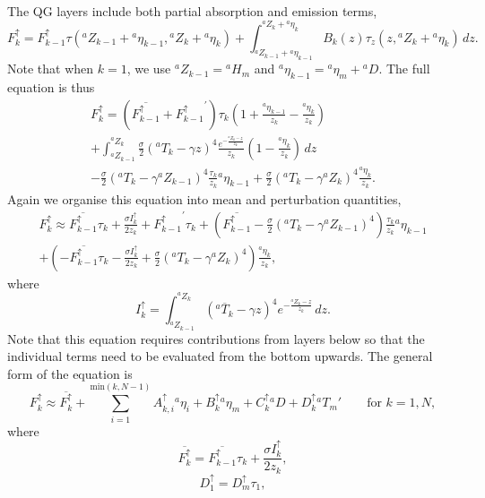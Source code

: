 \documentclass[11pt, a4paper,twoside]{article}
\newcommand{\etb}[2]{{{}^{#1}\eta_{#2}}}
\newcommand{\HH}[2]{{{}^{#1}H_{#2}}}
\newcommand{\Z}[2]{{{}^{#1}Z_{#2}}}
\newcommand{\T}[2]{{{}^{#1}T_{#2}}}
\newcommand{\aup}[1]{A^{\uparrow}_{#1}}
\newcommand{\bup}[1]{B^{\uparrow}_{#1}}
\newcommand{\cupp}[1]{C^{\uparrow}_{#1}}
\newcommand{\dup}[1]{D^{\uparrow}_{#1}}
\newcommand{\iup}[1]{I^{\uparrow}_{#1}}
\newcommand{\Fup}[1]{{F^{\uparrow}_{#1}}}
\newcommand{\B}[1]{{B_{#1}}}
\newcommand{\D}[1]{{}^{#1}D}
\numberwithin{equation}{section}
\begin{document}
\begin{description}
The QG layers include both partial absorption and emission terms,
\begin{equation}\label{eq:fluxn}
\Fup{k} = \Fup{k-1} \tau(\Z{a}{k-1}+\etb{a}{k-1},\Z{a}{k}+\etb{a}{k}) + \int_{\Z{a}{k-1}+\etb{a}{k-1}}^{\Z{a}{k}+\etb{a}{k}} \B{k}(z) {\tau_z(z,\Z{a}{k}+\etb{a}{k})} \, dz.
\end{equation}
Note that when $k=1$, we use $\Z{a}{k-1} = \HH{a}{m}$ and $\etb{a}{k-1} = \etb{a}{m} + \D{a}$.
The full equation is thus
\begin{multline}
\Fup{k} =  \left(\overline{\Fup{k-1}} + \Fup{k-1}^{\prime}\right) \tau_k \left(1 + \frac{\etb{a}{k-1}}{z_k} - \frac{\etb{a}{k}}{z_k}\right)  \\
+ \int_{\Z{a}{k-1}}^{\Z{a}{k}} \frac{\sigma}{2}(\T{a}{k} - \gamma z)^4  \frac{e^{-\frac{\Z{a}{k}- z }{z_k}}}{z_k} \left( 1 - \frac{\etb{a}{k}}{z_k}\right) \, dz \\
-  \frac{\sigma}{2}(\T{a}{k} - \gamma \Z{a}{k-1})^4 \frac{\tau_k}{z_k} \etb{a}{k-1} +  \frac{\sigma}{2}(\T{a}{k} - \gamma \Z{a}{k})^4 \frac{\etb{a}{k}}{z_k}.
\end{multline}
Again we organise this equation into mean and perturbation quantities,
\begin{multline}
\Fup{k} \approx \overline{\Fup{k-1}}\tau_k + \frac{\sigma \iup{k}}{2 z_k} + \Fup{k-1}^{\prime} \tau_k + \left(\overline{\Fup{k-1}} - \frac{\sigma}{2}(\T{a}{k} - \gamma \Z{a}{k-1})^4\right) \frac{\tau_k}{z_k} \etb{a}{k-1}\\
+ \left( - \overline{\Fup{k-1}} \tau_k - \frac{\sigma \iup{k}}{2 z_k}+  \frac{\sigma}{2}(\T{a}{k} - \gamma \Z{a}{k})^4  \right) \frac{\etb{a}{k}}{z_k},
\end{multline}
where
\[\iup{k} = \int_{\Z{a}{k-1}}^{\Z{a}{k}} \left(\overline{\T{a}{k}} - \gamma z\right)^4 e^{-\frac{\Z{a}{k}- z}{z_k}} \,dz.\]
Note that this equation requires contributions from layers below so that the individual terms need to be evaluated from the bottom upwards.
The general form of the equation is
\begin{equation}
\Fup{k} \approx \overline{\Fup{k}} + \sum_{i=1}^{\textrm{min}(k,N-1)}\aup{k,i}\etb{a}{i} + \bup{k} \etb{a}{m} + \cupp{k} \D{a} + \dup{k}\T{a}{m}'\quad \quad \textrm{for }k=1,N,
\end{equation}
where
\begin{equation}
\overline{\Fup{k}} =\overline{\Fup{k-1}}\tau_k + \frac{\sigma \iup{k}}{2 z_k} ,
\end{equation}
\begin{equation}
\dup{1} = \dup{m} \tau_1,

\end{equation}
\end{description}
\end{document}
